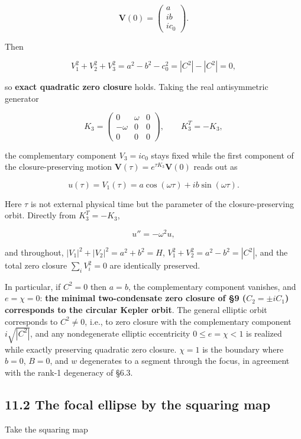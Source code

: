 \documentclass[
  a4paper,
]{article}
\begin{document}
\[
\boxed{
\mathbf V(0)=
\begin{pmatrix}
a\\ ib\\ ic_0
\end{pmatrix}
}.
\]

Then

\[
V_1^2+V_2^2+V_3^2=a^2-b^2-c_0^2=|C^2|-|C^2|=0,
\]

so \textbf{exact quadratic zero closure} holds. Taking the real
antisymmetric generator

\[
\boxed{
K_3=
\begin{pmatrix}
0&\omega&0\\
-\omega&0&0\\
0&0&0
\end{pmatrix}
},
\qquad K_3^T=-K_3,
\]

the complementary component \(V_3=ic_0\) stays fixed while the first
component of the closure-preserving motion
\(\mathbf V(\tau)=e^{\tau K_3}\mathbf V(0)\) reads out as

\[
\boxed{
u(\tau)=V_1(\tau)=a\cos(\omega\tau)+ib\sin(\omega\tau)
}.
\]

Here \(\tau\) is not external physical time but the parameter of the
closure-preserving orbit. Directly from \(K_3^T=-K_3\),

\[
u''=-\omega^2u,
\]

and throughout, \(|V_1|^2+|V_2|^2=a^2+b^2=H\),
\(V_1^2+V_2^2=a^2-b^2=|C^2|\), and the total zero closure
\(\sum_iV_i^2=0\) are identically preserved.

In particular, if \(C^2=0\) then \(a=b\), the complementary component
vanishes, and \(e=\chi=0\): \textbf{the minimal two-condensate zero
closure of §9 (\(C_2=\pm iC_1\)) corresponds to the circular Kepler
orbit}. The general elliptic orbit corresponds to \(C^2\neq0\), i.e., to
zero closure with the complementary component \(i\sqrt{|C^2|}\), and any
nondegenerate elliptic eccentricity \(0\le e=\chi<1\) is realized while
exactly preserving quadratic zero closure. \(\chi=1\) is the boundary
where \(b=0\), \(B=0\), and \(w\) degenerates to a segment through the
focus, in agreement with the rank-1 degeneracy of §6.3.

\subsection{11.2 The focal ellipse by the squaring
map}\label{the-focal-ellipse-by-the-squaring-map}

Take the squaring map
\end{document}
